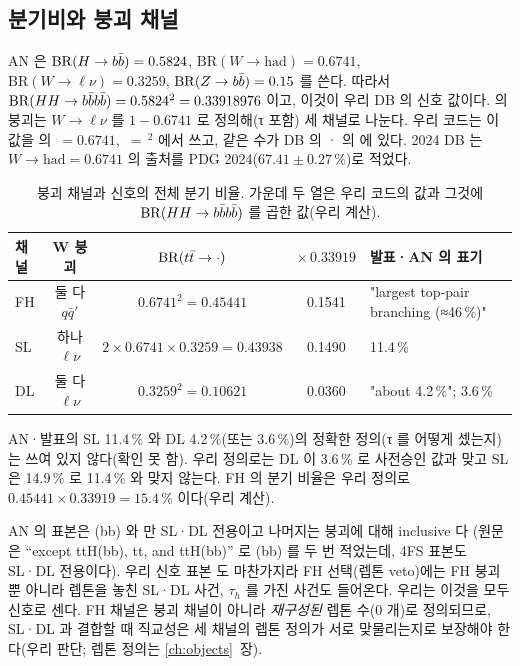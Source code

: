 \subsection{분기비와 붕괴 채널}\label{sec:intro-br}

AN 은 $\mathrm{BR}(H\to b\bar{b})=0.5824$, $\mathrm{BR}(W\to\mathrm{had})=0.6741$, $\mathrm{BR}(W\to\ell\nu)=0.3259$, $\mathrm{BR}(Z\to b\bar{b})=0.15$ 를 쓴다.
따라서 $\mathrm{BR}(HH\to b\bar{b}b\bar{b})=0.5824^{2}=0.33918976$ 이고, 이것이 우리 DB 의 신호  값이다. \ttbar 의 붕괴는
$W\to\ell\nu$ 를 $1-0.6741$ 로 정의해(τ 포함) 세 채널로 나눈다. 우리 코드는 이 값을  의 $\,=0.6741$,
$\,=$\,$^{2}$ 에서 쓰고, 같은 수가 DB 의 · 의  에 있다.
2024 DB 는 $W\to\mathrm{had}=0.6741$ 의 출처를 PDG 2024($67.41\pm0.27\,\%$)로 적었다.

\begin{table}[htbp]
\centering
\caption{\ttbar 붕괴 채널과 신호의 전체 분기 비율. 가운데 두 열은 우리 코드의 값과 그것에 $\mathrm{BR}(\HHfourb)$ 를 곱한 값(우리 계산).}
\label{tab:intro-br}
\small
\begin{tabularx}{\textwidth}{l c c c L}
\toprule
채널 & W 붕괴 & $\mathrm{BR}(t\bar{t}\to\cdot)$ & $\times\,0.33919$ & 발표·AN 의 표기 \\
\midrule
FH & 둘 다 $q\bar q'$ & $0.6741^{2}=0.45441$ & 0.1541 & "largest top-pair branching (≈46\,\%)" \\
SL & 하나 $\ell\nu$  & $2\times0.6741\times0.3259=0.43938$ & 0.1490 & 11.4\,\% \\
DL & 둘 다 $\ell\nu$ & $0.3259^{2}=0.10621$ & 0.0360 & "about 4.2\,\%"; 3.6\,\% \\
\bottomrule
\end{tabularx}
\end{table}

AN·발표의 SL 11.4\,\% 와 DL 4.2\,\%(또는 3.6\,\%)의 정확한 정의(τ 를 어떻게 셌는지)는 쓰여 있지 않다(확인 못 함). 우리 정의로는 DL 이 3.6\,\% 로
사전승인 값과 맞고 SL 은 14.9\,\% 로 11.4\,\% 와 맞지 않는다. FH 의 분기 비율은 우리 정의로 $0.45441\times0.33919=15.4\,\%$ 이다(우리 계산).

\begin{note}
AN 의 표본은 \ttH(bb) 와 \ttbar 만 SL·DL 전용이고 나머지는 \ttbar 붕괴에 대해 inclusive 다
(원문은 ``except ttH(bb), tt, and ttH(bb)'' 로 \ttH(bb) 를 두 번 적었는데, 4FS \ttbb 표본도 SL·DL 전용이다). 우리 신호 표본
 도 마찬가지라 FH 선택(렙톤 veto)에는 FH 붕괴뿐 아니라 렙톤을 놓친 SL·DL 사건, $\tau_h$ 를 가진 사건도 들어온다. 우리는 이것을 모두 신호로
센다. FH 채널은 붕괴 채널이 아니라 \emph{재구성된} 렙톤 수(0 개)로 정의되므로, SL·DL 과 결합할 때 직교성은 세 채널의 렙톤 정의가 서로 맞물리는지로
보장해야 한다(우리 판단; 렙톤 정의는 \ref{ch:objects}~장).
\end{note}

